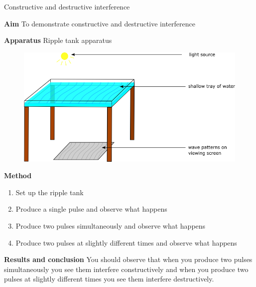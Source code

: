 	
\par
\label{m38802*eip-791}
\begin{g_experiment}{Constructive and destructive interference}

\textbf{Aim}
To demonstrate constructive and destructive interference
\par 
\label{m38802*eip7241}\noindent{}\textbf{Apparatus} 
Ripple tank apparatus
    \setcounter{subfigure}{0}
	\begin{figure}[H] %
    \begin{center}
    \label{m38802*id63458!!!underscore!!!media}\label{m38802*id63458!!!underscore!!!printimage}\includegraphics[width=0.8\columnwidth]{col11305.imgs/m38802_rippletray.png} %
      \vspace{2pt}
    \vspace{.1in}
    \end{center}
 \end{figure}       \par 
\label{m38802*eip7474}\noindent{}\textbf{Method}
\label{m38802*id6242}\begin{enumerate}[noitemsep, label=\textbf{\arabic*}. ] 
            \item Set up the ripple tank\item Produce a single pulse and observe what happens\item Produce two pulses simultaneously and observe what happens\item Produce two pulses at slightly different times and observe what happens\end{enumerate}
\par 
\label{m38802*id614134}\noindent{}\textbf{Results and conclusion}
You should observe that when you produce two pulses simultaneously you see them interfere constructively and when you produce two pulses at slightly different times you see them interfere destructively.
\par \label{m38802*secfhsst!!!underscore!!!id636}
\end{g_experiment}


